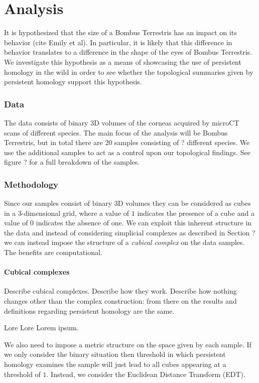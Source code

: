 \chapter{Analysis }
It is hypothesized that the size of a Bombus Terrestris has an impact on its behavior (cite Emily et al). In particular, it is likely that this difference in behavior translates to a difference in the shape of the eyes of Bombus Terrestris. We investigate this hypothesis as a means of showcasing the use of persistent homology in the wild in order to see whether the topological summaries given by persistent homology support this hypothesis.
\subsection{Data}
The data consists of binary 3D volumes of the corneas acquired by microCT scans of different species. The main focus of the analysis will be Bombus Terrestris, but in total there are 20 samples consisting of ? different species. We use the additional samples to act as a control upon our topological findings. See figure ? for a full breakdown of the samples.
\subsection{Methodology}
Since our samples consist of binary 3D volumes they can be considered as cubes in a 3-dimensional grid, where a value of $1$ indicates the presence of a cube and a value of $0$ indicates the absence of one. We can exploit this inherent structure in the data and instead of considering simplicial complexes as described in Section ? we can instead impose the structure of a \textit{cubical complex} on the data samples. The benefits are computational.

\subsubsection{Cubical complexes}
Describe cubical complexes. Describe how they work. Describe how nothing changes other than the complex construction: from there on the results and definitions regarding persistent homology are the same.

Lore
Lore
Lorem ipsum.

We also need to impose a metric structure on the space given by each sample. If we only consider the binary situation then threshold in which persistent homology examines the sample will just lead to all cubes appearing at a threshold of $1$. Instead, we consider the Euclidean Distance Transform (EDT).

